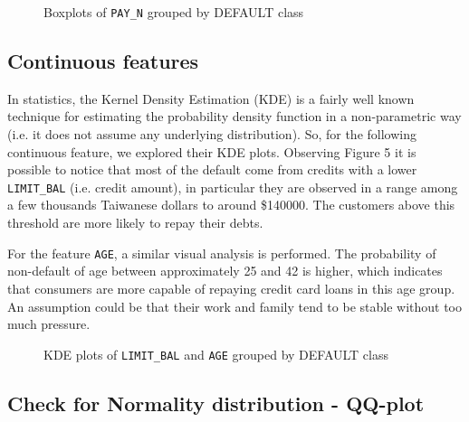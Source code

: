 \documentclass{article}
\begin{document}
\begin{figure}[h]
\centering

\caption{Boxplots of \texttt{PAY\_N} grouped by DEFAULT class}
\end{figure}


\subsection{Continuous features}
In statistics, the Kernel Density Estimation (KDE) is a fairly well known technique for estimating the probability density function in a non-parametric way (i.e. it does not assume any underlying distribution). So, for the following continuous feature, we explored their KDE plots.
Observing Figure 5 it is possible to notice that most of the default come from credits with a lower \texttt{LIMIT\_BAL} (i.e. credit amount), in particular they are observed in a range among a few thousands Taiwanese dollars to around \$140000. The customers above this threshold are more likely to repay their debts.

For the feature \texttt{AGE}, a similar visual analysis is performed. The probability of non-default of age between approximately 25 and 42 is higher, which indicates that consumers are more capable of repaying credit card loans in this age group. An assumption could be that their work and family tend to be stable without too much pressure.

\begin{figure}[H]
\centering

\caption{KDE plots of \texttt{LIMIT\_BAL} and \texttt{AGE} grouped by DEFAULT class}
\end{figure}

\subsection{Check for Normality distribution - QQ-plot}
\end{document}
